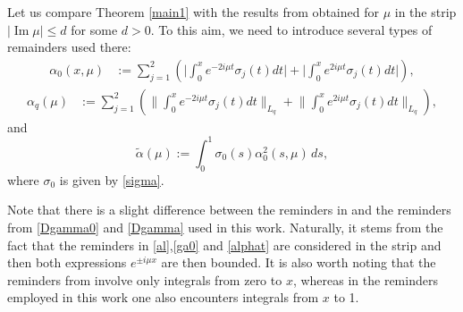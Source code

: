 \documentclass[11pt]{amsart}
\theoremstyle{plain}
\theoremstyle{definition}
\theoremstyle{remark}
\numberwithin{equation}{section}
\renewcommand\Im{\operatorname{Im}}
\begin{document}
Let us compare Theorem \ref{main1} with the results from \cite{Rzep21} obtained for $\mu$ in the strip
$|\Im \mu| \leq d $ for some $d>0$.
To this aim, we need to introduce several types of remainders used there:
\begin{align}\label{al}
\alpha_0(x,\mu)&:=\sum_{j=1}^2\left(\Big|\int_0^xe^{-2i\mu t}\sigma_j(t)dt\Big|+\Big|\int_0^xe^{2i\mu t}\sigma_j(t)dt\Big|\right),
\end{align}
\begin{align}\label{ga0}
\alpha_q(\mu)&:=\sum_{j=1}^2\left(\Big\|\int_0^xe^{-2i\mu t}\sigma_j(t)dt\Big\|_{L_q}+\Big\|\int_0^xe^{2i\mu t}\sigma_j(t)dt\Big\|_{L_q}
\right),
\end{align}
and
\begin{equation}\label{alphat}
\widetilde{\alpha}(\mu):=\int_0^1 \sigma_0(s)\alpha_0^2(s,\mu)\,ds,
\end{equation}
where $\sigma_0$ is given by \eqref{sigma}.

Note that there is a slight difference between the reminders in \cite{Rzep21} and the
reminders from \eqref{Dgamma0} and \eqref{Dgamma} used in this work.
Naturally, it stems from the fact that the reminders in \eqref{al},\eqref{ga0} and \eqref{alphat} are considered in the strip
and then both expressions $e^{\pm i\mu x}$ are then bounded.
 It is also worth noting that  the reminders from \cite{Rzep21}
involve only integrals from zero to $x$, whereas in
the reminders employed in this work one also encounters integrals from $x$ to 1.

\end{document}
